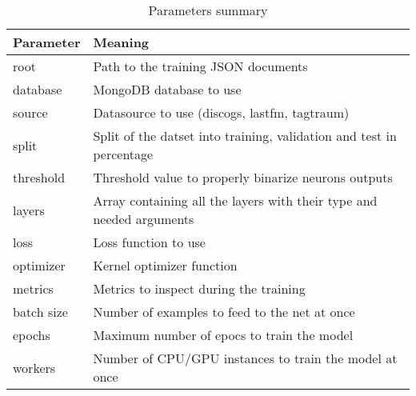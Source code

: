 \begin{table}[h!]
    \centering
    \begin{tabularx}{\textwidth}{l X} 
        \hline
        Parameter & Meaning \\ [0.5ex] 
        \hline
        root & Path to the training JSON documents\\
        database &  MongoDB database to use \\
        source & Datasource to use (discogs, lastfm, tagtraum)\\
        split & Split of the datset into training, validation and test in percentage \\
        threshold & Threshold value to properly binarize neurons outputs \\
        layers & Array containing all the layers with their type and needed arguments \\
        loss & Loss function to use \\
        optimizer & Kernel optimizer function \\
        metrics & Metrics to inspect during the training \\
        batch size & Number of examples to feed to the net at once \\
        epochs & Maximum number of epocs to train the model \\
        workers & Number of CPU/GPU instances to train the model at once \\
        \hline
    \end{tabularx}
    \caption{Parameters summary}
    \label{table:Parameters summary}
\end{table}